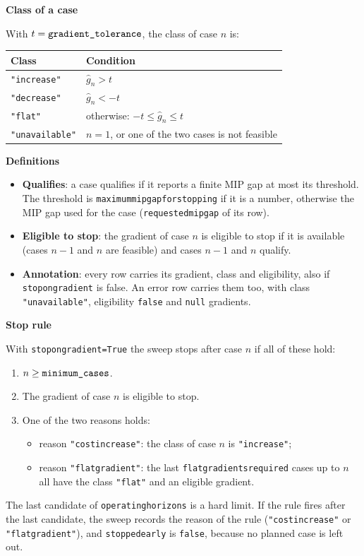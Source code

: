 \documentclass[11pt,a4paper]{article}
\makeatletter
\theoremstyle{plain}
\theoremstyle{definition}
\newcommand{\blockhead}[1]{\par\noindent\textbf{#1}\par\nobreak}
\renewcommand{\_}{\textunderscore\allowbreak{}}
\providecommand{\rejrow}[2]{{\raggedright #1\par} & {\raggedright #2\par} \\}
\providecommand{\tabstart}[2]{\begingroup\small\begin{longtable}{@{}#1@{}}\toprule #2 \\ \midrule \endhead}
\providecommand{\tabend}{\bottomrule\end{longtable}\endgroup}
\makeatother
\begin{document}
\blockhead{Class of a case}
With $t = \texttt{gradient\_tolerance}$, the class of case $n$ is:
\tabstart{p{3.4cm}p{11.6cm}}{Class & Condition}
\rejrow{\texttt{"increase"}}{$\hat g_n > t$}
\rejrow{\texttt{"decrease"}}{$\hat g_n < -t$}
\rejrow{\texttt{"flat"}}{otherwise: $-t \le \hat g_n \le t$}
\rejrow{\texttt{"unavailable"}}{$n = 1$, or one of the two cases is not feasible}
\tabend

\blockhead{Definitions}
\begin{itemize}[nosep,leftmargin=1.5em]
  \item \textbf{Qualifies}: a case qualifies if it reports a finite MIP gap at most its threshold. The threshold is \texttt{maximum\_mip\_gap\_for\_stopping} if it is a number, otherwise the MIP gap used for the case (\texttt{requested\_mip\_gap} of its row).
  \item \textbf{Eligible to stop}: the gradient of case $n$ is eligible to stop if it is available (cases $n-1$ and $n$ are feasible) and cases $n-1$ and $n$ qualify.
  \item \textbf{Annotation}: every row carries its gradient, class and eligibility, also if \texttt{stop\_on\_gradient} is false. An error row carries them too, with class \texttt{"unavailable"}, eligibility \texttt{false} and \texttt{null} gradients.
\end{itemize}

\blockhead{Stop rule}
With \texttt{stop\_on\_gradient=True} the sweep stops after case $n$ if all of these hold:
\begin{enumerate}[nosep,label=\arabic*.]
  \item $n \ge \texttt{minimum\_cases}$.
  \item The gradient of case $n$ is eligible to stop.
  \item One of the two reasons holds:
    \begin{itemize}[nosep]
      \item reason \texttt{"cost\_increase"}: the class of case $n$ is \texttt{"increase"};
      \item reason \texttt{"flat\_gradient"}: the last \texttt{flat\_gradients\_required} cases up to $n$ all have the class \texttt{"flat"} and an eligible gradient.
    \end{itemize}
\end{enumerate}
The last candidate of \texttt{operating\_horizons} is a hard limit. If the rule fires after the last candidate, the sweep records the reason of the rule (\texttt{"cost\_increase"} or \texttt{"flat\_gradient"}), and \texttt{stopped\_early} is \texttt{false}, because no planned case is left out.
\end{document}
